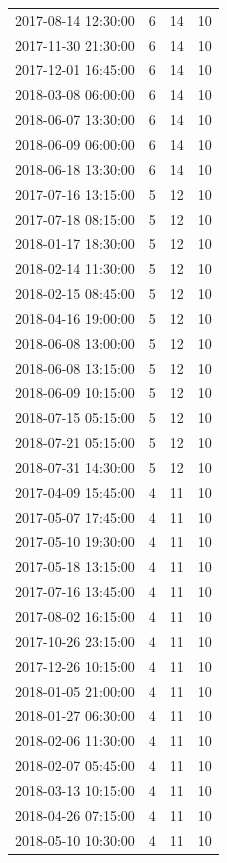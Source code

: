 \begin{tabular}{lrrr}
2017-08-14 12:30:00 & 6 & 14 & 10 \\
2017-11-30 21:30:00 & 6 & 14 & 10 \\
2017-12-01 16:45:00 & 6 & 14 & 10 \\
2018-03-08 06:00:00 & 6 & 14 & 10 \\
2018-06-07 13:30:00 & 6 & 14 & 10 \\
2018-06-09 06:00:00 & 6 & 14 & 10 \\
2018-06-18 13:30:00 & 6 & 14 & 10 \\
2017-07-16 13:15:00 & 5 & 12 & 10 \\
2017-07-18 08:15:00 & 5 & 12 & 10 \\
2018-01-17 18:30:00 & 5 & 12 & 10 \\
2018-02-14 11:30:00 & 5 & 12 & 10 \\
2018-02-15 08:45:00 & 5 & 12 & 10 \\
2018-04-16 19:00:00 & 5 & 12 & 10 \\
2018-06-08 13:00:00 & 5 & 12 & 10 \\
2018-06-08 13:15:00 & 5 & 12 & 10 \\
2018-06-09 10:15:00 & 5 & 12 & 10 \\
2018-07-15 05:15:00 & 5 & 12 & 10 \\
2018-07-21 05:15:00 & 5 & 12 & 10 \\
2018-07-31 14:30:00 & 5 & 12 & 10 \\
2017-04-09 15:45:00 & 4 & 11 & 10 \\
2017-05-07 17:45:00 & 4 & 11 & 10 \\
2017-05-10 19:30:00 & 4 & 11 & 10 \\
2017-05-18 13:15:00 & 4 & 11 & 10 \\
2017-07-16 13:45:00 & 4 & 11 & 10 \\
2017-08-02 16:15:00 & 4 & 11 & 10 \\
2017-10-26 23:15:00 & 4 & 11 & 10 \\
2017-12-26 10:15:00 & 4 & 11 & 10 \\
2018-01-05 21:00:00 & 4 & 11 & 10 \\
2018-01-27 06:30:00 & 4 & 11 & 10 \\
2018-02-06 11:30:00 & 4 & 11 & 10 \\
2018-02-07 05:45:00 & 4 & 11 & 10 \\
2018-03-13 10:15:00 & 4 & 11 & 10 \\
2018-04-26 07:15:00 & 4 & 11 & 10 \\
2018-05-10 10:30:00 & 4 & 11 & 10 \\

\end{tabular}
